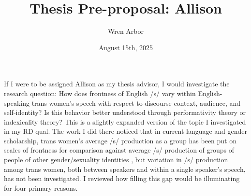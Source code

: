 \documentclass[11pt]{article}
\title{Thesis Pre-proposal: Allison}
\author{Wren Arbor}
\date{August 15th, 2025}
\begin{document}
\maketitle

If I were to be assigned Allison as my thesis advisor, I would investigate the research question: How does frontness of English /s/ vary within English-speaking trans women's speech with respect to discourse context, audience, and self-identity? Is this behavior better understood through performativity theory or indexicality theory? This is a slightly expanded version of the topic I investigated in my RD qual. The work I did there noticed that in current language and gender scholarship, trans women's average /s/ production as a group has been put on scales of frontness for comparison against average /s/ production of groups of people of other gender/sexuality identities \parencite[see][] {hazenberg_language_2012, podesva_sexuality_2015}, but variation in /s/ production among trans women, both between speakers and within a single speaker's speech, has not been investigated. I reviewed how filling this gap would be illuminating for four primary reasons. 
\end{document}
